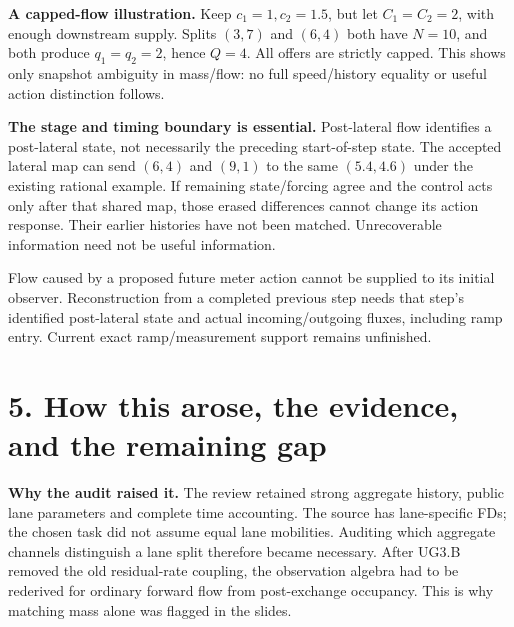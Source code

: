 \documentclass[11pt]{article}
\begin{document}
\textbf{A capped-flow illustration.} Keep \(c_1=1,c_2=1.5\), but let
\(C_1=C_2=2\), with enough downstream supply. Splits \((3,7)\) and
\((6,4)\) both have \(N=10\), and both produce \(q_1=q_2=2\), hence
\(Q=4\). All offers are strictly capped. This shows only snapshot ambiguity
in mass/flow: no full speed/history equality or useful action distinction follows.

\textbf{The stage and timing boundary is essential.}
Post-lateral flow identifies a post-lateral state, not necessarily the preceding
start-of-step state. The accepted lateral map can send \((6,4)\) and \((9,1)\)
to the same \((5.4,4.6)\) under the existing rational example. If remaining
state/forcing agree and the control acts only after that shared map, those
erased differences cannot change its action response. Their earlier histories
have not been matched. Unrecoverable information need not be useful information.

Flow caused by a proposed future meter action cannot be supplied to its initial
observer. Reconstruction from a completed previous step needs that step's
identified post-lateral state and actual incoming/outgoing fluxes, including
ramp entry. Current exact ramp/measurement support remains unfinished.

\newpage
\section*{5. How this arose, the evidence, and the remaining gap}
\textbf{Why the audit raised it.} The review retained strong aggregate history,
public lane parameters and complete time accounting. The source has lane-specific
FDs; the chosen task did not assume equal lane mobilities. Auditing which
aggregate channels distinguish a lane split therefore became necessary.
After UG3.B removed the old residual-rate coupling, the observation algebra had
to be rederived for ordinary forward flow from post-exchange occupancy. This
is why matching mass alone was flagged in the slides.
\end{document}
